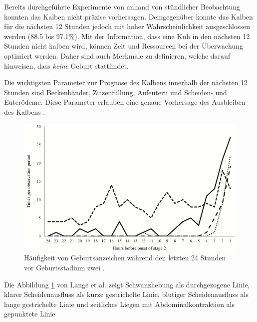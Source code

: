 Bereits durchgeführte Experimente von \citep[S. 1]{Lange2017} anhand von stündlicher Beobachtung konnten das Kalben nicht präzise vorhersagen. Demgegenüber konnte das Kalben für die nächsten 12 Stunden jedoch mit hoher Wahrscheinlichkeit ausgeschlossen werden (88.5 bis 97.1\%). Mit der Information, dass eine Kuh in den nächsten 12 Stunden nicht kalben wird, können Zeit und Ressourcen bei der Überwachung optimiert werden. Daher sind auch Merkmale zu definieren, welche darauf hinweisen, dass \textit{keine} Geburt stattfindet.

Die wichtigsten Parameter zur Prognose des Kalbens innerhalb der nächsten 12 Stunden sind Beckenbänder, Zitzenfüllung,  \gls{Aufeutern} und Scheiden- und Euterödeme. Diese Parameter erlauben eine genaue Vorhersage des Ausbleiben des Kalbens \citep[S. 4]{Streyl2011}.



\begin{figure}[H]
	\center
	\includegraphics[scale=.45]{Grafiken/observationTimes.png}
	\caption{Häufigkeit von Geburtsanzeichen während den letzten 24 Stunden vor Geburtsstadium zwei \citep[S.5]{Lange2017}.}
	\label{fig: Häufigkeit von Geburtsanzeichen }
\end{figure}

Die Abbildung \ref{fig: Häufigkeit von Geburtsanzeichen } von Lange et al. zeigt Schwanzhebung als durchgezogene Linie, klarer Scheidenausfluss als kurze gestrichelte Linie,  blutiger Scheidenausfluss als lange gestrichelte Linie und seitliches Liegen mit Abdominalkontraktion als gepunktete Linie
